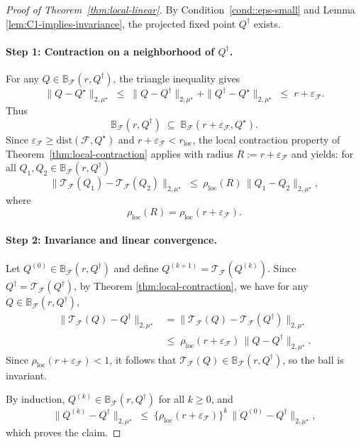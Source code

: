 \documentclass{article}
\theoremstyle{plain}
\theoremstyle{definition}
\theoremstyle{remark}
\begin{document}
\begin{proof}[Proof of Theorem~\ref{thm:local-linear}]
By Condition~\ref{cond::eps-small} and Lemma \ref{lem:C1-implies-invariance}, the projected fixed point
$Q^\dagger$ exists.

\paragraph{Step 1: Contraction on a neighborhood of $Q^\dagger$.}
For any $Q \in \mathbb{B}_{\mathcal F}(r,Q^\dagger)$, the triangle
inequality gives
\[
\|Q - Q^\star\|_{2,\mu^\star}
\;\le\;
\|Q - Q^\dagger\|_{2,\mu^\star}
+
\|Q^\dagger - Q^\star\|_{2,\mu^\star}
\;\le\;
r + \varepsilon_{\mathcal F}.
\]
Thus
\[
\mathbb{B}_{\mathcal F}(r,Q^\dagger)
\;\subseteq\;
\mathbb{B}_{\mathcal F}(r + \varepsilon_{\mathcal F}, Q^\star).
\]
Since $\varepsilon_{\mathcal F} \ge \mathrm{dist}(\mathcal F, Q^\star)$ and
$r + \varepsilon_{\mathcal F} < r_{\mathrm{loc}}$, the local contraction property of
Theorem~\ref{thm:local-contraction} applies with radius
$R := r + \varepsilon_{\mathcal F}$ and yields: for all $Q_1,Q_2 \in \mathbb{B}_{\mathcal F}(r,Q^\dagger)$
\[
\|\mathcal T_{\mathcal F}(Q_1) - \mathcal T_{\mathcal F}(Q_2)\|_{2,\mu^\star}
\;\le\;
\rho_{\mathrm{loc}}(R)\,\|Q_1 - Q_2\|_{2,\mu^\star},
\]
where
\[
\rho_{\mathrm{loc}}(R)=\rho_{\mathrm{loc}}(r+\varepsilon_{\mathcal F}).
\]




\paragraph{Step 2: Invariance and linear convergence.}
Let $Q^{(0)} \in \mathbb{B}_{\mathcal F}(r,Q^\dagger)$ and define
$Q^{(k+1)} = \mathcal T_{\mathcal F}(Q^{(k)})$. Since
$Q^\dagger = \mathcal T_{\mathcal F}(Q^\dagger)$, by Theorem \ref{thm:local-contraction}, we have
for any $Q \in \mathbb{B}_{\mathcal F}(r,Q^\dagger)$,
\begin{align*}
\|\mathcal T_{\mathcal F}(Q) - Q^\dagger\|_{2,\mu^\star}
&=
\|\mathcal T_{\mathcal F}(Q)
   - \mathcal T_{\mathcal F}(Q^\dagger)\|_{2,\mu^\star}
\\[0.3em]
&\le\;
\rho_{\mathrm{loc}}(r+\varepsilon_{\mathcal F})\,
\|Q - Q^\dagger\|_{2,\mu^\star}.
\end{align*}
Since $ \rho_{\mathrm{loc}}(r+\varepsilon_{\mathcal F}) < 1$, it follows that
$\mathcal T_{\mathcal F}(Q) \in \mathbb{B}_{\mathcal F}(r,Q^\dagger)$,
so the ball is invariant.

By induction, $Q^{(k)} \in \mathbb{B}_{\mathcal F}(r,Q^\dagger)$
for all $k \ge 0$, and
\[
\|Q^{(k)} - Q^\dagger\|_{2,\mu^\star}
\;\le\;
 \{\rho_{\mathrm{loc}}(r+\varepsilon_{\mathcal F})\}^k\,\|Q^{(0)} - Q^\dagger\|_{2,\mu^\star},
\]
which proves the claim.


\end{proof}
\end{document}
